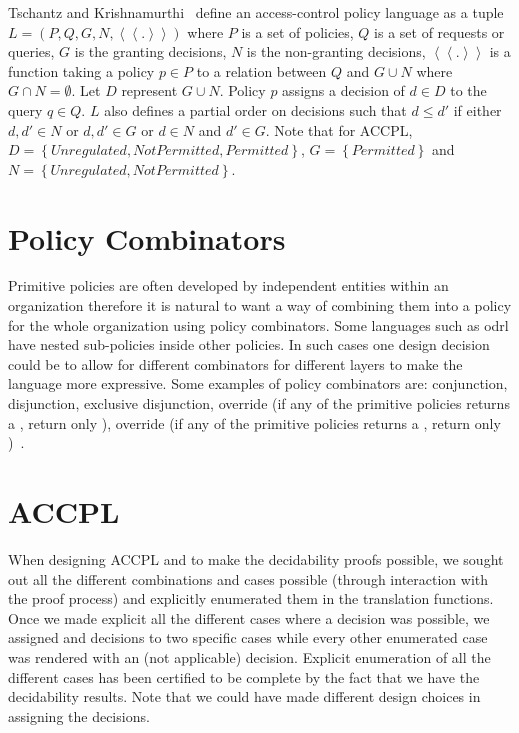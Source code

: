 Tschantz and Krishnamurthi~\cite{Tschantz} define an access-control policy language as a tuple $L = (P, Q, G, N, \left\langle\left\langle . \right\rangle\right\rangle)$ where $P$ is a set of policies, $Q$ is a set of requests or queries, $G$ is the granting decisions, $N$ is the non-granting decisions, $\left\langle\left\langle . \right\rangle\right\rangle$ is a function taking a policy $p \in P$ to a relation between $Q$ and $G \cup N$ where $G \cap N = \emptyset$. Let $D$ represent $G \cup N$. Policy $p$ assigns a decision of $d \in D$ to the query $q \in Q$. $L$ also defines a partial order on decisions such that $d \leq d'$ if either $d, d' \in N$ or $d, d' \in G$ or $d \in N$ and $d' \in G$. Note that for \ac{ACCPL}, $D = \left\{ {Unregulated, NotPermitted, Permitted}\right\}$, $G = \left\{ {Permitted}\right\}$ and $N = \left\{ {Unregulated, NotPermitted}\right\}$.


\section{Policy Combinators}\label{sec:policycombinators}

Primitive policies are often developed by independent entities within an organization therefore it is natural to want a way of combining them into a policy for the whole organization using policy combinators. Some languages such as \ac{odrl} have nested sub-policies inside other policies. In such cases one design decision could be to allow for different combinators for different layers to make the language more expressive. Some examples of policy combinators are: conjunction, disjunction, exclusive disjunction,  override (if any of the primitive policies returns a , return only ),  override (if any of the primitive policies returns a , return only )~\cite{Tschantz}.

\section{ACCPL}

When designing \ac{ACCPL} and to make the decidability proofs possible, we sought out all the different combinations and cases possible (through interaction with the proof process) and explicitly enumerated them in the translation functions. Once we made explicit all the different cases where a decision was possible, we assigned  and  decisions to two specific cases while every other enumerated case was rendered with an  (not applicable) decision. Explicit enumeration of all the different cases has been certified to be complete by the fact that we have the decidability results. Note that we could have made different design choices in assigning the decisions. 

